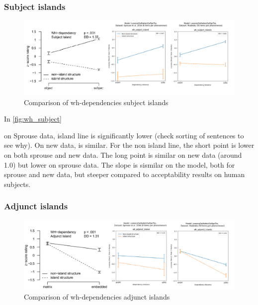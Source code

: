 \subsubsection{Subject islands}

\begin{figure}
	\centering
	\includegraphics[width=1\textwidth]{images/Chapter1/combined_wh-subject.png} 
	\caption{Comparison of wh-dependencies subject islands} 
	\label{fig:wh_subject} %
\end{figure}

In \autoref{fig:wh_subject}

on Sprouse data, island line is significantly lower (check sorting of sentences to see why). On new data, is similar.
For the non island line, the short point is lower on both sprouse and new data. The long point is similar on new data (around 1.0) but lower on sprouse data. The slope is sismilar on the model, both for sprouse and new data, but steeper compared to acceptability results on human subjects.


\subsubsection{Adjunct islands}

\begin{figure}
	\centering
	\includegraphics[width=1\textwidth]{images/Chapter1/combined_wh-adjunct.png} 
	\caption{Comparison of wh-dependencies adjunct islands} 
	\label{fig:wh_adjunct} %
\end{figure}


